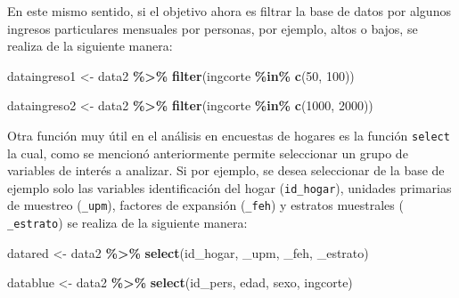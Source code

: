\documentclass[
  spanish,
  12pt,
]{book}
\newenvironment{Shaded}{\begin{snugshade}}{\end{snugshade}}
\newcommand{\AttributeTok}[1]{\textcolor[rgb]{0.13,0.29,0.53}{#1}}
\newcommand{\DecValTok}[1]{\textcolor[rgb]{0.00,0.00,0.81}{#1}}
\newcommand{\FunctionTok}[1]{\textcolor[rgb]{0.13,0.29,0.53}{\textbf{#1}}}
\newcommand{\NormalTok}[1]{#1}
\newcommand{\OtherTok}[1]{\textcolor[rgb]{0.56,0.35,0.01}{#1}}
\newcommand{\SpecialCharTok}[1]{\textcolor[rgb]{0.81,0.36,0.00}{\textbf{#1}}}
\newcommand{\StringTok}[1]{\textcolor[rgb]{0.31,0.60,0.02}{#1}}
\begin{document}
En este mismo sentido, si el objetivo ahora es filtrar la base de datos por algunos ingresos particulares mensuales por personas, por ejemplo, altos o bajos, se realiza de la siguiente manera:

\begin{Shaded}
\begin{Highlighting}[]
\NormalTok{dataingreso1 }\OtherTok{\textless{}{-}}\NormalTok{ data2 }\SpecialCharTok{\%\textgreater{}\%} 
  \FunctionTok{filter}\NormalTok{(ingcorte }\SpecialCharTok{\%in\%} \FunctionTok{c}\NormalTok{(}\DecValTok{50}\NormalTok{, }\DecValTok{100}\NormalTok{))}

\NormalTok{dataingreso2 }\OtherTok{\textless{}{-}}\NormalTok{ data2 }\SpecialCharTok{\%\textgreater{}\%} 
  \FunctionTok{filter}\NormalTok{(ingcorte }\SpecialCharTok{\%in\%} \FunctionTok{c}\NormalTok{(}\DecValTok{1000}\NormalTok{, }\DecValTok{2000}\NormalTok{))}
\end{Highlighting}
\end{Shaded}

Otra función muy útil en el análisis en encuestas de hogares es la función \texttt{select} la cual, como se mencionó anteriormente permite seleccionar un grupo de variables de interés a analizar. Si por ejemplo, se desea seleccionar de la base de ejemplo solo las variables identificación del hogar (\texttt{id\_hogar}), unidades primarias de muestreo (\texttt{\_upm}), factores de expansión (\texttt{\_feh}) y estratos muestrales ( \texttt{\_estrato}) se realiza de la siguiente manera:

\begin{Shaded}
\begin{Highlighting}[]
\NormalTok{datared }\OtherTok{\textless{}{-}}\NormalTok{ data2 }\SpecialCharTok{\%\textgreater{}\%} \FunctionTok{select}\NormalTok{(}\StringTok{\textasciigrave{}}\AttributeTok{id\_hogar}\StringTok{\textasciigrave{}}\NormalTok{, }\StringTok{\textasciigrave{}}\AttributeTok{\_upm}\StringTok{\textasciigrave{}}\NormalTok{,}
                            \StringTok{\textasciigrave{}}\AttributeTok{\_feh}\StringTok{\textasciigrave{}}\NormalTok{, }\StringTok{\textasciigrave{}}\AttributeTok{\_estrato}\StringTok{\textasciigrave{}}\NormalTok{)}

\NormalTok{datablue }\OtherTok{\textless{}{-}}\NormalTok{ data2 }\SpecialCharTok{\%\textgreater{}\%} \FunctionTok{select}\NormalTok{(id\_pers, edad, }
\NormalTok{                             sexo, ingcorte)}
\end{Highlighting}
\end{Shaded}
\end{document}

